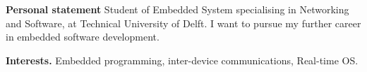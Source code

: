 %
%

\par{
{\textbf{Personal statement}} 
Student of Embedded System specialising in Networking and Software, at Technical University of Delft. I want to pursue my further career in embedded software development.

{\textbf{Interests.}} 
Embedded programming, inter-device communications, Real-time OS. 
}